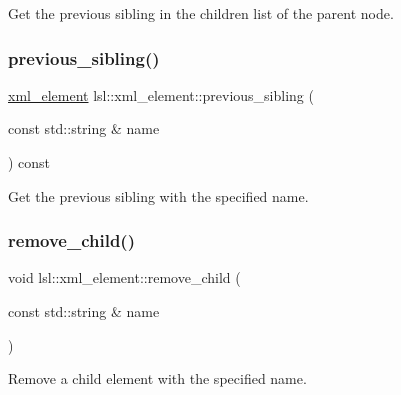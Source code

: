 Get the previous sibling in the children list of the parent node. 

\mbox{\label{classlsl_1_1xml__element_a70b90853b7edfaebfe69bc1103ed6b8b}} 
\subsubsection{\texorpdfstring{previous\+\_\+sibling()}{previous\_sibling()}\hspace{0.1cm}{\footnotesize\ttfamily [2/2]}}
{\footnotesize\ttfamily \hyperlink{classlsl_1_1xml__element}{xml\+\_\+element} lsl\+::xml\+\_\+element\+::previous\+\_\+sibling (\begin{DoxyParamCaption}\item[{const std\+::string \&}]{name }\end{DoxyParamCaption}) const\hspace{0.3cm}{\ttfamily [inline]}}



Get the previous sibling with the specified name. 

\mbox{\label{classlsl_1_1xml__element_ad23da57ac3a6a7f3dd849be0a8b44a47}} 
\subsubsection{\texorpdfstring{remove\+\_\+child()}{remove\_child()}\hspace{0.1cm}{\footnotesize\ttfamily [1/2]}}
{\footnotesize\ttfamily void lsl\+::xml\+\_\+element\+::remove\+\_\+child (\begin{DoxyParamCaption}\item[{const std\+::string \&}]{name }\end{DoxyParamCaption})\hspace{0.3cm}{\ttfamily [inline]}}



Remove a child element with the specified name. 

\mbox{\label{classlsl_1_1xml__element_a0c07b18ef39b7f6d683b9612e2a9104e}} 
